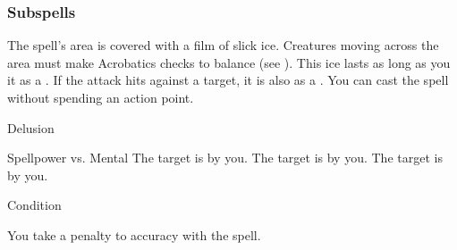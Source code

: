 \subsubsection{Subspells}
The spell's area is covered with a film of slick ice.
Creatures moving across the area must make Acrobatics checks to balance (see ).
This ice lasts as long as you  it as a .
If the attack hits against a target, it is also  as a .
You can cast the spell without spending an action point.
\begin{spellsection}{Delusion}
\begin{spellheader}
\end{spellheader}
\begin{spellcontent}
\begin{spelltargetinginfo}
\end{spelltargetinginfo}
\begin{spelleffects}
\begin{spellattack}{Spellpower vs. Mental}
\spellsuccess The target is \frightened by you.
\spellcritical The target is \panicked by you.
\spellfailure The target is \shaken by you.
\end{spellattack}
\spelldur Condition
\end{spelleffects}
\end{spellcontent}
\begin{spellfooter}
\end{spellfooter}
\begin{spellsubcontent}
\begin{spellcantrip}
You take a  penalty to accuracy with the spell.
\end{spellcantrip}
\end{spellsubcontent}
\end{spellsection}
